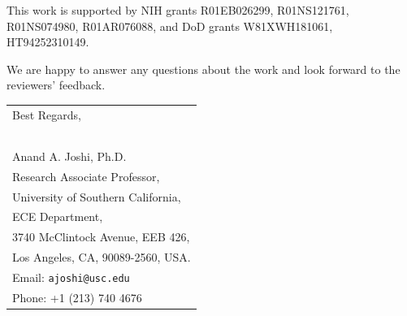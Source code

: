 \documentclass[10pt]{article}
\begin{document}
This work is supported by NIH grants R01EB026299, R01NS121761, R01NS074980, R01AR076088, and DoD grants W81XWH181061, HT94252310149.

We are happy to answer any questions about the work and look forward to the reviewers' feedback.
\vspace{1cm}
\bigskip
\hspace{1cm}
\begin{tabular}{ l @{} }
  Best Regards, \\ \\ \\ \\  \\ \\
  Anand A. Joshi, Ph.D. \\
  Research Associate Professor,\\
  University of Southern California, \\
  ECE Department, \\ 
   3740 McClintock Avenue, EEB 426, \\
   Los Angeles, CA, 90089-2560, USA. \\ 
Email: \texttt{ajoshi@usc.edu}\\
Phone: +1 (213) 740 4676

\end{tabular}
\end{document}
